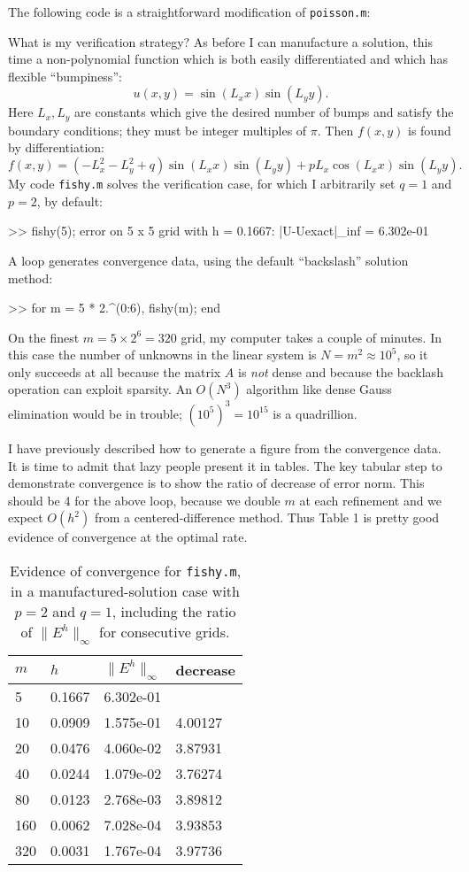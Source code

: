\documentclass[11pt]{amsart}
\newcommand{\mfile}[2]{
\bigskip
\begin{quote}
\medskip
\VerbatimInput[frame=single,framesep=3mm,label=\fbox{\normalsize \textsl{\,#1\,}},fontfamily=courier,fontsize=\scriptsize]{#2}
\medskip
\end{quote}
}
\begin{document}
The following code is a straightforward modification of \texttt{poisson.m}:


What is my verification strategy?  As before I can manufacture a solution, this time a non-polynomial function which is both easily differentiated and which has flexible ``bumpiness'':
    $$u(x,y) = \sin(L_x x) \sin(L_y y).$$
Here $L_x,L_y$ are constants which give the desired number of bumps and satisfy the boundary conditions; they must be integer multiples of $\pi$.  Then $f(x,y)$ is found by differentiation:
    $$f(x,y) = \left(-L_x^2-L_y^2+q\right) \sin(L_x x) \sin(L_y y) + p L_x \cos(L_x x) \sin(L_y y).$$
My code \texttt{fishy.m} solves the verification case, for which I arbitrarily set $q=1$ and $p=2$, by default:
\begin{mVerb}
>> fishy(5);
error on 5 x 5 grid with h = 0.1667:  |U-Uexact|_inf = 6.302e-01
\end{mVerb}

A loop generates convergence data, using the default ``backslash'' solution method:
\begin{mVerb}
>> for m = 5 * 2.^(0:6), fishy(m); end
\end{mVerb}
On the finest $m=5 \times 2^6 = 320$ grid, my computer takes a couple of minutes.  In this case the number of unknowns in the linear system is $N=m^2\approx 10^5$, so it only succeeds at all because the matrix $A$ is \emph{not} dense and because the backlash operation can exploit sparsity.  An $O(N^3)$ algorithm like dense Gauss elimination would be in trouble; $(10^5)^3 = 10^{15}$ is a quadrillion.

I have previously described how to generate a figure from the convergence data.  It is time to admit that lazy people present it in tables.  The key tabular step to demonstrate convergence is to show the ratio of decrease of error norm.  This should be 4 for the above loop, because we double $m$ at each refinement and we expect $O(h^2)$ from a centered-difference method.  Thus Table 1 is pretty good evidence of convergence at the optimal rate.
\begin{table}
\begin{tabular}{llll}
$m$ & $h$ & $\|E^h\|_\infty$ & decrease \\ \hline
5 & 0.1667 & 6.302e-01 & \\
10 & 0.0909 & 1.575e-01 & 4.00127 \\
20 & 0.0476 & 4.060e-02 & 3.87931 \\
40 & 0.0244 & 1.079e-02 & 3.76274 \\
80 & 0.0123 & 2.768e-03 & 3.89812 \\
160 & 0.0062 & 7.028e-04 & 3.93853 \\
320 & 0.0031 & 1.767e-04 & 3.97736
\end{tabular}

\bigskip
\caption{Evidence of convergence for \texttt{fishy.m}, in a manufactured-solution case with $p=2$ and $q=1$, including the ratio of $\|E^h\|_\infty$ for consecutive grids.}
\end{table}
\end{document}
